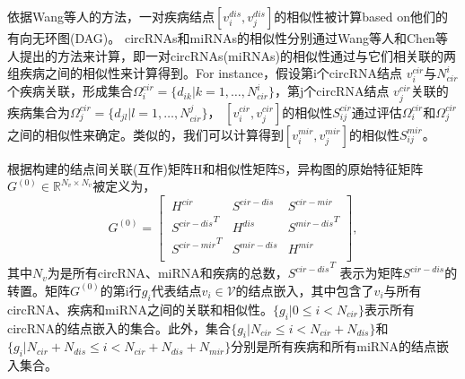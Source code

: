 \documentclass{bioinfo}
\begin{document}
\begin{methods}
依据Wang等人\cite{wang2010inferring}的方法，一对疾病结点$[v_i^{dis},v_j^{dis}]$的相似性被计算based on他们的有向无环图(DAG)。
circRNAs和miRNAs的相似性分别通过Wang等人\cite{wang2010inferring}和Chen等人\cite{chen2015constructing}提出的方法来计算，即一对circRNAs(miRNAs)的相似性通过与它们相关联的两组疾病之间的相似性来计算得到。For instance，假设第i个circRNA结点 $v_i^{cir}$与$N_{cir}^i$个疾病关联，形成集合$\Omega_i^{cir} = \{d_{ik} | k = 1, \ldots, N_{cir}^i\}$，第j个circRNA结点 $v_j^{cir}$关联的疾病集合为$\Omega_j^{cir} = \{d_{jl} | l = 1, \ldots, N_{cir}^j\}$， $[v_i^{cir},v_j^{cir}]$的相似性$S_{ij}^{cir}$通过评估$\Omega_i^{cir}$和$\Omega_j^{cir}$之间的相似性来确定。类似的，我们可以计算得到$[v_i^{mir},v_j^{mir}]$的相似性$S_{ij}^{mir}$。

根据构建的结点间关联(互作)矩阵H和相似性矩阵S，异构图的原始特征矩阵$G^{(0)} \in \mathbb{R}^{N_v\times N_v}$被定义为，
\begin{equation}
G^{(0)} = \left[\ \begin{array}{lll}
H^{cir} & S^{cir-dis} & S^{cir-mir}\\
{S^{cir-dis}}^T & H^{dis} & {S^{mir-dis}}^T\\
{S^{cir-mir}}^T & S^{mir-dis} & H^{mir}\\
\end{array} \right],
\end{equation}
其中$N_v$为是所有circRNA、miRNA和疾病的总数，${S^{cir-dis}}^T$ 表示为矩阵$S^{cir-dis}$的转置。矩阵$G^{(0)}$的第i行$g_i$代表结点$v_i \in \mathcal{V}$的结点嵌入，其中包含了$v_i$与所有circRNA、疾病和miRNA之间的关联和相似性。$\{g_i | 0 \leqslant  i < N_{cir}\}$表示所有circRNA的结点嵌入的集合。此外，集合$\{g_i | N_{cir} \leqslant  i < N_{cir} + N_{dis}\}$和$\{g_i | N_{cir} + N_{dis} \leqslant  i < N_{cir} + N_{dis} + N_{mir}\}$分别是所有疾病和所有miRNA的结点嵌入集合。

\vspace{0.3cm}




\end{methods}
\end{document}

